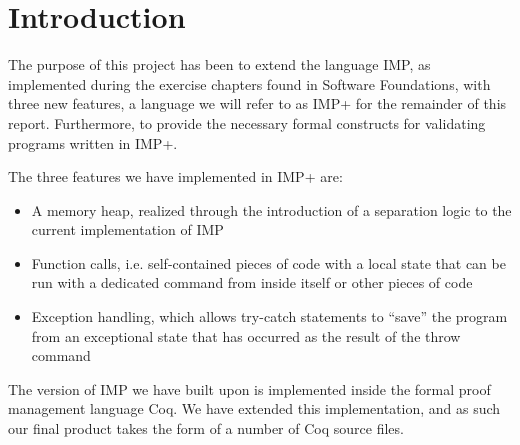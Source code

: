 \section{Introduction}
The purpose of this project has been to extend the language IMP, as implemented during the exercise chapters found in Software Foundations, with three new features, a language we will refer to as IMP+ for the remainder of this report. Furthermore, to provide the necessary formal constructs for validating programs written in IMP+.

The three features we have implemented in IMP+ are:
\begin{itemize}
\item A memory heap, realized through the introduction of a separation logic to the current implementation of IMP
\item Function calls, i.e. self-contained pieces of code with a local state that can be run with a dedicated command from inside itself or other pieces of code
\item Exception handling, which allows try-catch statements to “save” the program from an exceptional state that has occurred as the result of the throw command
\end{itemize}

The version of IMP we have built upon is implemented inside the formal proof management language Coq. We have extended this implementation, and as such our final product takes the form of a number of Coq source files.